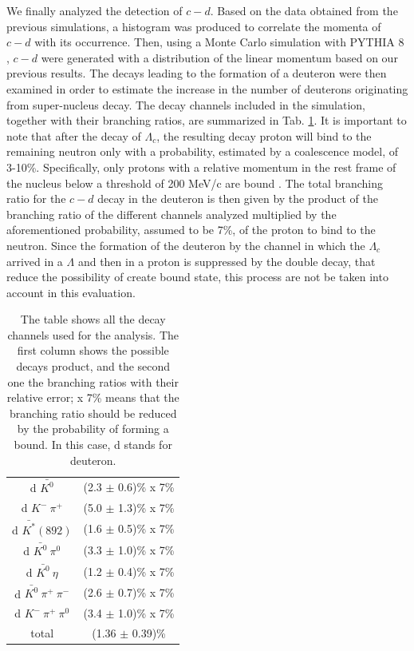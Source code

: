 \documentclass[12pt,a4paper]{book}
\begin{document}
	
	We finally analyzed the detection of $c-d$. Based on the data obtained from the previous simulations, a histogram was produced to correlate the momenta of $c-d$ with its occurrence. Then, using a Monte Carlo simulation with PYTHIA 8 \cite{biderman2023pythiasuiteanalyzinglarge}, $c-d$ were generated with a distribution of the linear momentum based on our previous results. The decays leading to the formation of a deuteron were then examined in order to estimate the increase in the number of deuterons originating from super-nucleus decay. The decay channels included in the simulation, together with their branching ratios, are summarized in Tab. \ref{tab:decay_channel}. It is important to note that after the decay of $\Lambda_c$, the resulting decay proton will bind to the remaining neutron only with a probability, estimated by a coalescence model, of 3-10\%. Specifically, only protons with a relative momentum in the rest frame of the nucleus below a threshold of 200 MeV/c are bound \cite{alicecollaboration2022letterintentalice3}. The total branching ratio for the $c-d$ decay in the deuteron is then given by the product of the branching ratio of the different channels analyzed multiplied by the aforementioned probability, assumed to be 7\%, of the proton to bind to the neutron. Since the formation of the deuteron by the channel in which the $\Lambda_c$ arrived in a $\Lambda$ and then in a proton is suppressed by the double decay, that reduce the possibility of create bound state, this process are not be taken into account in this evaluation.
	\begin{table}[h]
		\centering
		\begin{tabular}{c|c}
			\hline
			\cellcolor{yellow} \text{Channel} & \cellcolor{yellow} \text{Branching ratio} \\
			\hline
			d $\bar{K^0}$ & (2.3 $\pm$ 0.6)\% x 7\% \\
			\hline
			d $K^- \ \pi^+$ &  (5.0 $\pm$ 1.3)\% x 7\% \\
			\hline
			d $\bar{K^*}(892)$ &  (1.6 $\pm$ 0.5)\% x 7\% \\
			\hline
			d $\bar{K^0} \ \pi^0$ &  (3.3 $\pm$ 1.0)\% x 7\% \\
			\hline
			d $\bar{K^0} \ \eta$ &  (1.2 $\pm$ 0.4)\% x 7\% \\
			\hline
			d $\bar{K^0} \ \pi^+ \ \pi^-$ &  (2.6 $\pm$ 0.7)\% x 7\% \\
			\hline
			d $K^- \ \pi^+ \ \pi^0$ &  (3.4 $\pm$ 1.0)\% x 7\% \\
			\hline
			total & (1.36 $\pm$ 0.39)\% \\
			\hline
		\end{tabular}
		\caption{The table shows all the decay channels used for the analysis. The first column shows the possible decays product, and the second one the branching ratios with their relative error; x 7\% means that the branching ratio should be reduced by the probability of forming a bound. In this case, d stands for deuteron.}
		\label{tab:decay_channel}
	\end{table}
	
\end{document}
